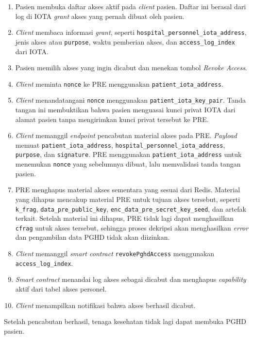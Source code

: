 \begin{enumerate}
    \item Pasien membuka daftar akses aktif pada \textit{client} pasien.
    Daftar ini berasal dari log di IOTA \textit{grant} akses yang pernah dibuat oleh pasien.

    \item \textit{Client} membaca informasi \textit{grant}, seperti \texttt{hospital\_personnel\_iota\_address}, jenis akses atau \texttt{purpose}, waktu pemberian akses, dan \texttt{access\_log\_index} dari IOTA\@.

    \item Pasien memilih akses yang ingin dicabut dan menekan tombol \textit{Revoke Access}.

    \item \textit{Client} meminta \texttt{nonce} ke PRE menggunakan \texttt{patient\_iota\_address}.

    \item \textit{Client} menandatangani \texttt{nonce} menggunakan \texttt{patient\_iota\_key\_pair}.
    Tanda tangan ini membuktikan bahwa pasien menguasai kunci privat IOTA dari alamat pasien tanpa mengirimkan kunci privat tersebut ke PRE\@.

    \item \textit{Client} memanggil \textit{endpoint} pencabutan material akses pada PRE\@.
    \textit{Payload} memuat \texttt{patient\_iota\_address}, \texttt{hospital\_personnel\_iota\_address}, \texttt{purpose}, dan \texttt{signature}. 
    PRE menggunakan \texttt{patient\_iota\_address} untuk menemukan \texttt{nonce} yang sebelumnya dibuat, lalu memvalidasi tanda tangan pasien.

    \item PRE menghapus material akses sementara yang sesuai dari Redis.
    Material yang dihapus mencakup material PRE untuk tujuan akses tersebut, seperti \texttt{k\_frag}, \texttt{data\_pre\_public\_key}, \texttt{enc\_data\_pre\_secret\_key\_seed}, dan artefak terkait. 
    Setelah material ini dihapus, PRE tidak lagi dapat menghasilkan \texttt{cfrag} untuk akses tersebut, sehingga proses dekripsi akan menghasilkan \textit{error} dan pengambilan data PGHD tidak akan diizinkan.

    \item \textit{Client} memanggil \textit{smart contract} \texttt{revokePghdAccess} menggunakan \texttt{access\_log\_index}.

    \item \textit{Smart contract} menandai log akses sebagai dicabut dan menghapus \textit{capability} aktif dari tabel akses personel.

    \item \textit{Client} menampilkan notifikasi bahwa akses berhasil dicabut.
\end{enumerate}

Setelah pencabutan berhasil, tenaga kesehatan tidak lagi dapat membuka PGHD pasien. 
